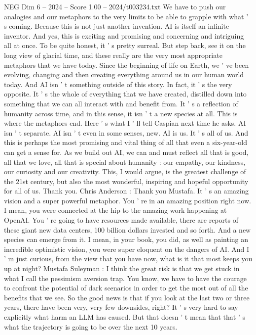 \begin{textsample}{NEG Dim 6 – 2024 – Score 1.00 – 2024/t003234.txt}
We have to push our analogies and our metaphors to the very limits to be able to grapple with what ' s coming.
Because this is not just another invention.
AI is itself an infinite inventor.
And yes, this is exciting and promising and concerning and intriguing all at once.
To be quite honest, it ' s pretty surreal.
But step back, see it on the long view of glacial time, and these really are the very most appropriate metaphors that we have today.
Since the beginning of life on Earth, we ' ve been evolving, changing and then creating everything around us in our human world today.
And AI isn ' t something outside of this story.
In fact, it ' s the very opposite.
It ' s the whole of everything that we have created, distilled down into something that we can all interact with and benefit from.
It ' s a reflection of humanity across time, and in this sense, it isn ' t a new species at all.
This is where the metaphors end.
Here ' s what I ' ll tell Caspian next time he asks.
AI isn ' t separate.
AI isn ' t even in some senses, new.
AI is us.
It ' s all of us.
And this is perhaps the most promising and vital thing of all that even a six-year-old can get a sense for.
As we build out AI, we can and must reflect all that is good, all that we love, all that is special about humanity : our empathy, our kindness, our curiosity and our creativity.
This, I would argue, is the greatest challenge of the 21st century, but also the most wonderful, inspiring and hopeful opportunity for all of us.
Thank you.
Chris Anderson : Thank you Mustafa.
It ' s an amazing vision and a super powerful metaphor.
You ' re in an amazing position right now.
I mean, you were connected at the hip to the amazing work happening at OpenAI.
You ' re going to have resources made available, there are reports of these giant new data centers, 100 billion dollars invested and so forth.
And a new species can emerge from it.
I mean, in your book, you did, as well as painting an incredible optimistic vision, you were super eloquent on the dangers of AI.
And I ' m just curious, from the view that you have now, what is it that most keeps you up at night?
Mustafa Suleyman : I think the great risk is that we get stuck in what I call the pessimism aversion trap.
You know, we have to have the courage to confront the potential of dark scenarios in order to get the most out of all the benefits that we see.
So the good news is that if you look at the last two or three years, there have been very, very few downsides, right?
It ' s very hard to say explicitly what harm an LLM has caused.
But that doesn ' t mean that that ' s what the trajectory is going to be over the next 10 years.

\end{textsample}
